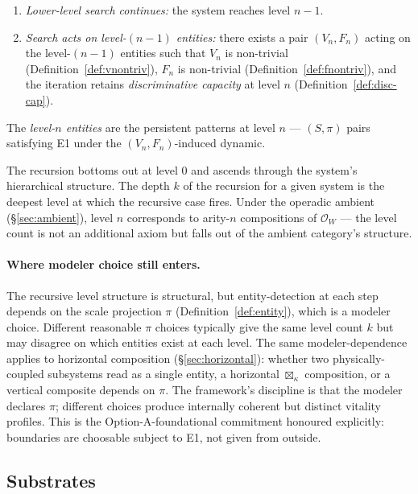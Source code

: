 \documentclass[journal]{IEEEtran}
\theoremstyle{plain}
\theoremstyle{definition}
\theoremstyle{plain}
\begin{document}
\begin{enumerate}[leftmargin=2em,itemsep=2pt]
  \item \emph{Lower-level search continues:} the system reaches level
    $n - 1$.
  \item \emph{Search acts on level-$(n{-}1)$ entities:} there exists a
    pair $(V_n, F_n)$ acting on the level-$(n{-}1)$ entities such that
    $V_n$ is non-trivial (Definition~\ref{def:vnontriv}), $F_n$ is
    non-trivial (Definition~\ref{def:fnontriv}), and the iteration
    retains \emph{discriminative capacity} at level $n$
    (Definition~\ref{def:disc-cap}).
\end{enumerate}

The \emph{level-$n$ entities} are the persistent patterns at level $n$
--- $(S, \pi)$ pairs satisfying E1 under the $(V_n, F_n)$-induced
dynamic.

The recursion bottoms out at level 0 and ascends through the system's
hierarchical structure. The depth $k$ of the recursion for a given
system is the deepest level at which the recursive case fires. Under the
operadic ambient (\S\ref{sec:ambient}), level $n$ corresponds to
arity-$n$ compositions of $\mathcal{O}_W$ --- the level count is not an
additional axiom but falls out of the ambient category's structure.

\paragraph{Where modeler choice still enters.} The recursive level
structure is structural, but entity-detection at each step depends on
the scale projection $\pi$ (Definition~\ref{def:entity}), which is a
modeler choice. Different reasonable $\pi$ choices typically give the
same level count $k$ but may disagree on which entities exist at each
level. The same modeler-dependence applies to horizontal composition
(\S\ref{sec:horizontal}): whether two physically-coupled subsystems
read as a single entity, a horizontal $\boxtimes_\kappa$ composition, or
a vertical composite depends on $\pi$. The framework's discipline is
that the modeler declares $\pi$; different choices produce internally
coherent but distinct vitality profiles. This is the
Option-A-foundational commitment honoured explicitly: boundaries are
choosable subject to E1, not given from outside.

\subsection{Substrates}\label{sec:substrates}
\end{document}
